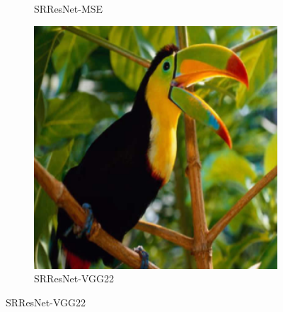 \documentclass[12pt,onecolumn,oneside,titlepage]{article}
\begin{document}
\begin{figure}[H]
\begin{subfigure}{0.3\textwidth}
  \caption{SRResNet-MSE}
  \end{subfigure}
  \begin{subfigure}{0.3\textwidth}
  \includegraphics[width=1\textwidth]{bird_HR} 
  \caption{SRResNet-VGG22}
  \end{subfigure}
  

\end{figure}
\end{document}
